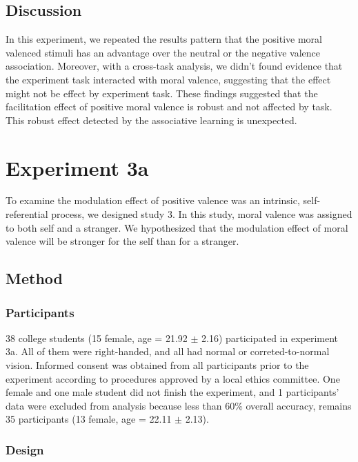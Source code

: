 \documentclass[
  english,
  man]{apa6}
\begin{document}
\hypertarget{discussion-2}{%
\subsection{Discussion}\label{discussion-2}}

In this experiment, we repeated the results pattern that the positive moral valenced stimuli has an advantage over the neutral or the negative valence association. Moreover, with a cross-task analysis, we didn't found evidence that the experiment task interacted with moral valence, suggesting that the effect might not be effect by experiment task.
These findings suggested that the facilitation effect of positive moral valence is robust and not affected by task. This robust effect detected by the associative learning is unexpected.

\hypertarget{experiment-3a}{%
\section{Experiment 3a}\label{experiment-3a}}

To examine the modulation effect of positive valence was an intrinsic, self-referential process, we designed study 3. In this study, moral valence was assigned to both self and a stranger. We hypothesized that the modulation effect of moral valence will be stronger for the self than for a stranger.

\hypertarget{method-3}{%
\subsection{Method}\label{method-3}}

\hypertarget{participants-4}{%
\subsubsection{Participants}\label{participants-4}}

38 college students (15 female, age = 21.92 \(\pm\) 2.16) participated in experiment 3a. All of them were right-handed, and all had normal or correted-to-normal vision. Informed consent was obtained from all participants prior to the experiment according to procedures approved by a local ethics committee. One female and one male student did not finish the experiment, and 1 participants' data were excluded from analysis because less than 60\% overall accuracy, remains 35 participants (13 female, age = 22.11 \(\pm\) 2.13).

\hypertarget{design}{%
\subsubsection{Design}\label{design}}
\end{document}
